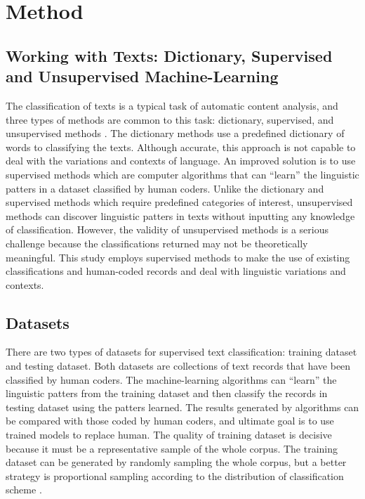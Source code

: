 \documentclass[12pt]{article}
\begin{document}
\section{Method}

\subsection{Working with Texts: Dictionary, Supervised and Unsupervised Machine-Learning}

The classification of texts is a typical task of automatic content analysis, and three types of methods are common to this task: dictionary, supervised, and unsupervised methods \parencite[268-269]{GrimmerTextDataPromise2013}. The dictionary methods use a predefined dictionary of words to classifying the texts. Although accurate, this approach is not capable to deal with the variations and contexts of language. An improved solution is to use supervised methods which are computer algorithms that can ``learn'' the linguistic patters in a dataset classified by human coders. Unlike the dictionary and supervised methods which require predefined categories of interest, unsupervised methods can discover linguistic patters in texts without inputting any knowledge of classification. However, the validity of unsupervised methods is a serious challenge because the classifications returned may not be theoretically meaningful. This study employs supervised methods to make the use of existing classifications and human-coded records and deal with linguistic variations and contexts. 

\subsection{Datasets}

There are two types of datasets for supervised text classification: training dataset and testing dataset. Both datasets are collections of text records that have been classified by human coders. The machine-learning algorithms can ``learn'' the linguistic patters from the training dataset and then classify the records in testing dataset using the patters learned. The results generated by algorithms can be compared with those coded by human coders, and ultimate goal is to use trained models to replace human. The quality of training dataset is decisive because it must be a representative sample of the whole corpus. The training dataset can be generated by randomly sampling the whole corpus, but a better strategy is proportional sampling according to the distribution of classification scheme \parencite[278]{GrimmerTextDataPromise2013}.
\end{document}

